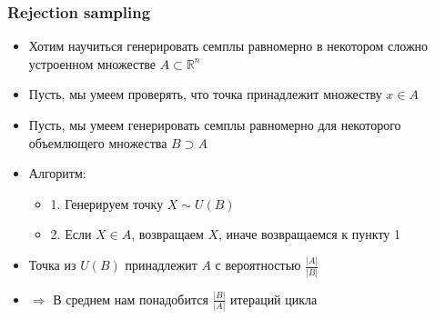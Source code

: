 \documentclass[handout,10pt]{beamer}
\begin{document}
\begin{frame}[fragile]
\frametitle{Rejection sampling}
\begin{itemize}
\item Хотим научиться генерировать семплы равномерно в некотором сложно устроенном множестве \begin{math}A \subset \mathbb R^n\end{math}
\pause
\item Пусть, мы умеем проверять, что точка принадлежит множеству \begin{math}x \in A\end{math}
\pause
\item Пусть, мы умеем генерировать семплы равномерно для некоторого объемлющего множества \begin{math}B\supset A\end{math}
\pause
\item Алгоритм:
\pause
\begin{itemize}
\item 1. Генерируем точку \begin{math}X \sim U(B)\end{math}
\pause
\item 2. Если \begin{math}X \in A\end{math}, возвращаем \begin{math}X\end{math}, иначе возвращаемся к пункту 1
\end{itemize}
\pause
\item Точка из \begin{math}U(B)\end{math} принадлежит \begin{math}A\end{math} с вероятностью \begin{math}\frac{|A|}{|B|}\end{math}
\pause
\item \begin{math}\Longrightarrow\end{math} В среднем нам понадобится \begin{math}\frac{|B|}{|A|}\end{math} итераций цикла
\end{itemize}
\end{frame}
\end{document}
